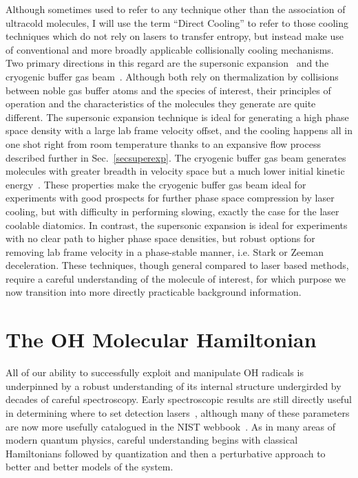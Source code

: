 Although sometimes used to refer to any technique other than the association of ultracold molecules, I will use the term ``Direct Cooling'' to refer to those cooling techniques which do not rely on lasers to transfer entropy, but instead make use of conventional and more broadly applicable collisionally cooling mechanisms.
Two primary directions in this regard are the supersonic expansion~\cite{Miller1988} and the cryogenic buffer gas beam~\cite{Hutzler2011a}.
Although both rely on thermalization by collisions between noble gas buffer atoms and the species of interest, their principles of operation and the characteristics of the molecules they generate are quite different.
The supersonic expansion technique is ideal for generating a high phase space density with a large lab frame velocity offset, and the cooling happens all in one shot right from room temperature thanks to an expansive flow process described further in Sec.~\ref{secsuperexp}.
The cryogenic buffer gas beam generates molecules with greater breadth in velocity space but a much lower initial kinetic energy~\citep[Fig.~1]{Hutzler2011a}.
These properties make the cryogenic buffer gas beam ideal for experiments with good prospects for further phase space compression by laser cooling, but with difficulty in performing slowing, exactly the case for the laser coolable diatomics.
In contrast, the supersonic expansion is ideal for experiments with no clear path to higher phase space densities, but robust options for removing lab frame velocity in a phase-stable manner, i.e. Stark or Zeeman deceleration.
These techniques, though general compared to laser based methods, require a careful understanding of the molecule of interest, for which purpose we now transition into more directly practicable background information.

\section{The OH Molecular Hamiltonian}

All of our ability to successfully exploit and manipulate OH radicals is underpinned by a robust understanding of its internal structure undergirded by decades of careful spectroscopy.
Early spectroscopic results are still directly useful in determining where to set detection lasers~\cite{Meerts1975}, although many of these parameters are now more usefully catalogued in the NIST webbook~\cite{Huber2018}.
As in many areas of modern quantum physics, careful understanding begins with classical Hamiltonians followed by quantization and then a perturbative approach to better and better models of the system. 

